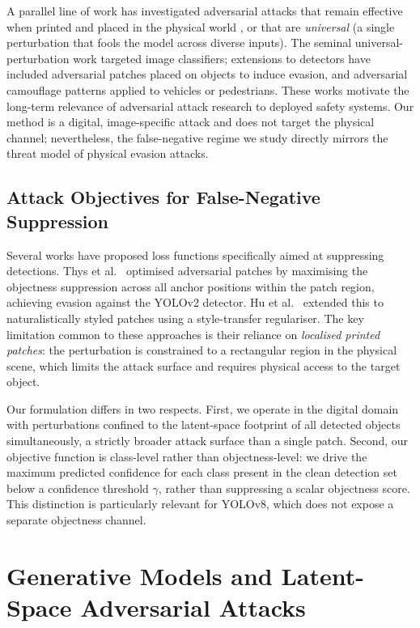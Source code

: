 \documentclass[12pt,a4paper]{report}
\begin{document}
A parallel line of work has investigated adversarial attacks that remain
effective when printed and placed in the physical world \cite{eykholt2018robust},
or that are \emph{universal} (a single perturbation that fools the
model across diverse inputs). The seminal universal-perturbation work
\cite{moosavi2017universal} targeted image classifiers; extensions to
detectors have included adversarial patches \cite{brown2017patch} placed on
objects to induce evasion, and adversarial camouflage patterns applied to
vehicles or pedestrians. These works motivate the long-term relevance of
adversarial attack research to deployed safety systems. Our method is a
digital, image-specific attack and does not target the physical channel;
nevertheless, the false-negative regime we study directly mirrors the threat
model of physical evasion attacks.

\subsection{Attack Objectives for False-Negative Suppression}

Several works have proposed loss functions specifically aimed at suppressing
detections. Thys et al.\ \cite{thys2019fooling} optimised adversarial patches
by maximising the objectness suppression across all anchor positions within
the patch region, achieving evasion against the YOLOv2 detector. Hu et al.\
\cite{hu2021naturalistic} extended this to naturalistically styled patches
using a style-transfer regulariser. The key limitation common to these
approaches is their reliance on \emph{localised printed patches}: the
perturbation is constrained to a rectangular region in the physical scene,
which limits the attack surface and requires physical access to the target
object.

Our formulation differs in two respects. First, we operate in the digital
domain with perturbations confined to the latent-space footprint of all
detected objects simultaneously, a strictly broader attack surface than a
single patch. Second, our objective function is class-level rather than
objectness-level: we drive the maximum predicted confidence for each class
present in the clean detection set below a confidence threshold $\gamma$,
rather than suppressing a scalar objectness score. This distinction is
particularly relevant for YOLOv8, which does not expose a separate objectness
channel.

\section{Generative Models and Latent-Space Adversarial Attacks}
\label{sec:generative_attacks}
\end{document}
